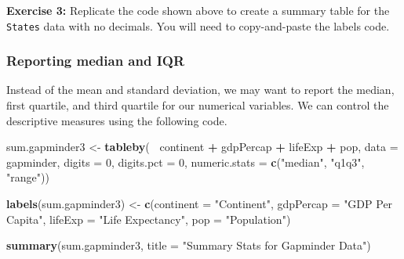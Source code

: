 \documentclass[
]{book}
\newenvironment{Shaded}{\begin{snugshade}}{\end{snugshade}}
\newcommand{\DataTypeTok}[1]{\textcolor[rgb]{0.13,0.29,0.53}{#1}}
\newcommand{\DecValTok}[1]{\textcolor[rgb]{0.00,0.00,0.81}{#1}}
\newcommand{\KeywordTok}[1]{\textcolor[rgb]{0.13,0.29,0.53}{\textbf{#1}}}
\newcommand{\NormalTok}[1]{#1}
\newcommand{\OperatorTok}[1]{\textcolor[rgb]{0.81,0.36,0.00}{\textbf{#1}}}
\newcommand{\StringTok}[1]{\textcolor[rgb]{0.31,0.60,0.02}{#1}}
\newenvironment{learncheck}%
{%
  \par\vspace{\baselineskip}\noindent 
  \color{Exercise}\begin{itshape}%
  \par\vspace{\baselineskip}\noindent\ignorespaces 
}%
{%
  \end{itshape}\ignorespacesafterend 
}
\begin{document}
\begin{learncheck}
\textbf{Exercise 3:} Replicate the code shown above to create a summary
table for the \texttt{States} data with no decimals. You will need to
copy-and-paste the labels code.
\end{learncheck}

\hypertarget{reporting-median-and-iqr}{%
\subsubsection*{Reporting median and IQR}\label{reporting-median-and-iqr}}

Instead of the mean and standard deviation, we may want to report the median, first quartile, and third quartile for our numerical variables. We can control the descriptive measures using the following code.

\begin{Shaded}
\begin{Highlighting}[]
\NormalTok{sum.gapminder3 <-}\StringTok{ }\KeywordTok{tableby}\NormalTok{(}\OperatorTok{~}\StringTok{ }\NormalTok{continent }\OperatorTok{+}\StringTok{ }\NormalTok{gdpPercap }\OperatorTok{+}\StringTok{ }\NormalTok{lifeExp }\OperatorTok{+}\StringTok{ }\NormalTok{pop, }\DataTypeTok{data =}\NormalTok{ gapminder, }\DataTypeTok{digits =} \DecValTok{0}\NormalTok{, }\DataTypeTok{digits.pct =} \DecValTok{0}\NormalTok{, }\DataTypeTok{numeric.stats =} \KeywordTok{c}\NormalTok{(}\StringTok{"median"}\NormalTok{, }\StringTok{"q1q3"}\NormalTok{, }\StringTok{"range"}\NormalTok{))}

\KeywordTok{labels}\NormalTok{(sum.gapminder3) <-}\StringTok{ }\KeywordTok{c}\NormalTok{(}\DataTypeTok{continent =} \StringTok{"Continent"}\NormalTok{, }\DataTypeTok{gdpPercap =} \StringTok{"GDP Per Capita"}\NormalTok{, }\DataTypeTok{lifeExp =} \StringTok{"Life Expectancy"}\NormalTok{, }\DataTypeTok{pop =} \StringTok{"Population"}\NormalTok{)}
\end{Highlighting}
\end{Shaded}

\begin{Shaded}
\begin{Highlighting}[]
\KeywordTok{summary}\NormalTok{(sum.gapminder3, }\DataTypeTok{title =} \StringTok{"Summary Stats for Gapminder Data"}\NormalTok{)}
\end{Highlighting}
\end{Shaded}
\end{document}
